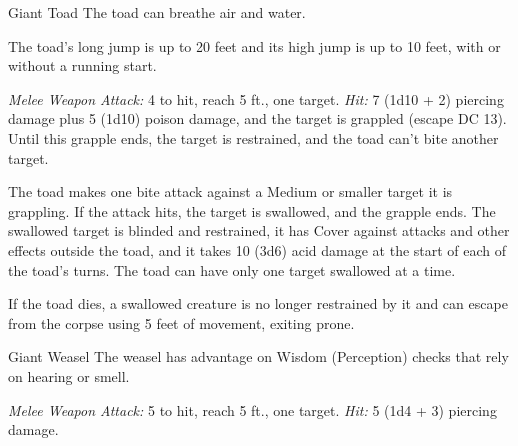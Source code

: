 \documentclass[10pt,a4paper,twoside,bg=print,twocolumn,openany,nodeprecatedcode]{dndbook}
\begin{document}
\begin{DndMonster}[float=t]{Giant Toad}
\DndMonsterBasics[
armor-class = {11},
hit-points = {\DndDice{6d10 + 6}},
speed = {20 ft., swim 40 ft.}
]
\DndMonsterAbilityScores[
 str = 15,
 dex = 13,
 con = 13,
 int = 2,
 wis = 10,
 cha = 3
]
\DndMonsterDetails[
senses = {darkvision 30 ft., passive perception 10},
challenge = 1,
]
The toad can breathe air and water.

The toad's long jump is up to 20 feet and its high jump is up to 10 feet, with or without a running start.

\textsl{Melee Weapon Attack:} 4 to hit, reach 5 ft., one target. \textsl{Hit:} 7 (1d10 + 2) piercing damage plus 5 (1d10) poison damage, and the target is grappled (escape DC 13). Until this grapple ends, the target is restrained, and the toad can't bite another target.

The toad makes one bite attack against a Medium or smaller target it is grappling. If the attack hits, the target is swallowed, and the grapple ends. The swallowed target is blinded and restrained, it has Cover against attacks and other effects outside the toad, and it takes 10 (3d6) acid damage at the start of each of the toad's turns. The toad can have only one target swallowed at a time.

If the toad dies, a swallowed creature is no longer restrained by it and can escape from the corpse using 5 feet of movement, exiting prone.

\end{DndMonster}



\begin{DndMonster}[float=t]{Giant Weasel}
\DndMonsterBasics[
armor-class = {13},
hit-points = {\DndDice{2d8}},
speed = {40 ft.}
]
\DndMonsterAbilityScores[
 str = 11,
 dex = 16,
 con = 10,
 int = 4,
 wis = 12,
 cha = 5
]
\DndMonsterDetails[
skills = {Perception +3, Stealth +5},
senses = {darkvision 60 ft., passive perception 13},
challenge = 1/8,
]
The weasel has advantage on Wisdom (Perception) checks that rely on hearing or smell.

\textsl{Melee Weapon Attack:} 5 to hit, reach 5 ft., one target. \textsl{Hit:} 5 (1d4 + 3) piercing damage.

\end{DndMonster}
\end{document}
